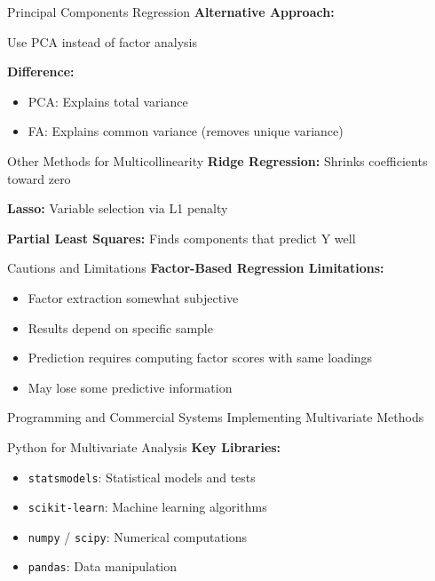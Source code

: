 \documentclass[aspectratio=169,ignorenonframetext]{beamer}
\begin{document}
\begin{frame}{Principal Components Regression}
\textbf{Alternative Approach:}

Use PCA instead of factor analysis

\textbf{Difference:}

\begin{itemize}
\item
  PCA: Explains total variance
\item
  FA: Explains common variance (removes unique variance)
\end{itemize}
\end{frame}

\begin{frame}{Other Methods for Multicollinearity}
\textbf{Ridge Regression:} Shrinks coefficients toward zero

\textbf{Lasso:} Variable selection via L1 penalty

\textbf{Partial Least Squares:} Finds components that predict Y well
\end{frame}

\begin{frame}{Cautions and Limitations}
\textbf{Factor-Based Regression Limitations:}

\begin{itemize}
\item
  Factor extraction somewhat subjective
\item
  Results depend on specific sample
\item
  Prediction requires computing factor scores with same loadings
\item
  May lose some predictive information
\end{itemize}
\end{frame}

\begin{frame}{Programming and Commercial Systems}
Implementing Multivariate Methods
\end{frame}

\begin{frame}[fragile]{Python for Multivariate Analysis}
\textbf{Key Libraries:}

\begin{itemize}
\item
  \texttt{statsmodels}: Statistical models and tests
\item
  \texttt{scikit-learn}: Machine learning algorithms
\item
  \texttt{numpy} / \texttt{scipy}: Numerical computations
\item
  \texttt{pandas}: Data manipulation
\end{itemize}
\end{frame}
\end{document}
